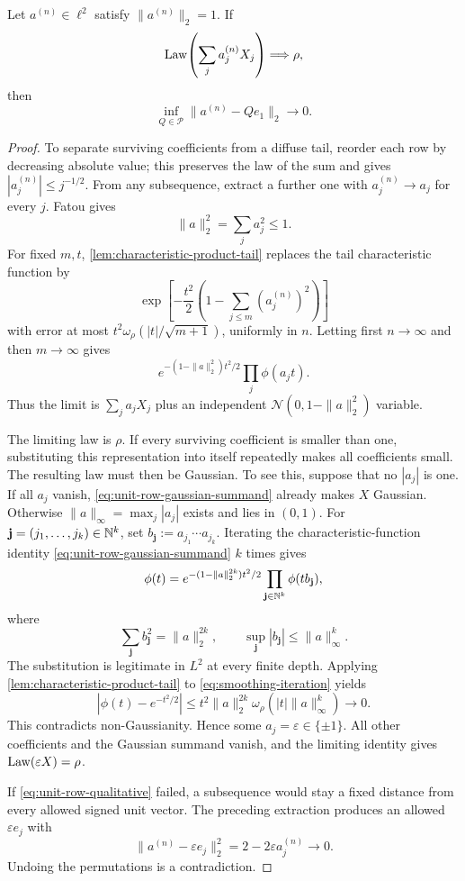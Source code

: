 \begin{lemma}
\label{lem:unit-row-rigidity}
Let $a^{(n)}\in\ell^2$ satisfy $\|a^{(n)}\|_2=1$.  If
\[
 \operatorname{Law}\!\left(\sum_j a_j^{(n)}X_j\right)
       \Longrightarrow\rho,
\]
then
\begin{equation}
 \inf_{Q\in\mathcal P}\|a^{(n)}-Qe_1\|_2\longrightarrow0.
 \label{eq:unit-row-qualitative}
\end{equation}
\end{lemma}
\begin{proof}
To separate surviving coefficients from a diffuse tail, reorder each row
by decreasing absolute value; this preserves the law of the
sum and gives $|a_j^{(n)}|\le j^{-1/2}$.  From any subsequence, extract a
further one with $a_j^{(n)}\to a_j$ for every $j$.  Fatou gives
\[
 \|a\|_2^2=\sum_j a_j^2\leq1.
\]
For fixed $m,t$, \cref{lem:characteristic-product-tail} replaces the tail
characteristic function by
\[
 \exp\!\left[-\frac{t^2}{2}
        \left(1-\sum_{j\leq m}(a_j^{(n)})^2\right)\right]
\]
with error at most $t^2\omega_\rho(|t|/\sqrt{m+1})$, uniformly in $n$.
Letting first $n\to\infty$ and then $m\to\infty$ gives
\begin{equation}
 e^{-(1-\|a\|_2^2)t^2/2}\prod_j\phi(a_jt).
 \label{eq:unit-row-gaussian-summand}
\end{equation}
Thus the limit is $\sum_j a_jX_j$ plus an independent
$\mathcal N(0,1-\|a\|_2^2)$ variable.

The limiting law is \(\rho\). If every surviving coefficient is smaller
than one, substituting this representation into itself repeatedly makes
all coefficients small. The resulting law must then be Gaussian.
To see this, suppose that no $|a_j|$ is one. If all $a_j$ vanish,
\eqref{eq:unit-row-gaussian-summand} already makes $X$ Gaussian.
Otherwise $\|a\|_\infty=\max_j|a_j|$ exists and lies in $(0,1)$.  For
$\mathbf j=(j_1,\ldots,j_k)\in\mathbb N^k$, set
$b_{\mathbf j}:=a_{j_1}\cdots a_{j_k}$.
Iterating the characteristic-function identity
\eqref{eq:unit-row-gaussian-summand} $k$ times gives
\begin{equation}
 \phi(t)=e^{-(1-\|a\|_2^{2k})t^2/2}
       \prod_{\mathbf j\in\mathbb N^k}\phi(tb_{\mathbf j}),
 \label{eq:smoothing-iteration}
\end{equation}
where
\[
 \sum_{\mathbf j} b_{\mathbf j}^2=\|a\|_2^{2k},
 \qquad \sup_{\mathbf j}|b_{\mathbf j}|\leq \|a\|_\infty^k.
\]
The substitution is legitimate in $L^2$ at every finite depth.  Applying
\cref{lem:characteristic-product-tail} to
\eqref{eq:smoothing-iteration} yields
\[
 |\phi(t)-e^{-t^2/2}|
 \leq t^2\|a\|_2^{2k}\omega_\rho(|t|\|a\|_\infty^k)\longrightarrow0.
\]
This contradicts non-Gaussianity.  Hence some
$a_j=\varepsilon\in\{\pm1\}$.  All other coefficients and the Gaussian
summand vanish, and the limiting identity gives $\operatorname{Law}(\varepsilon X)=\rho$.

If \eqref{eq:unit-row-qualitative} failed, a subsequence would stay a fixed
distance from every allowed signed unit vector.  The preceding extraction
produces an allowed $\varepsilon e_j$ with
\[
 \|a^{(n)}-\varepsilon e_j\|_2^2
       =2-2\varepsilon a_j^{(n)}\longrightarrow0.
\]
Undoing the permutations is a contradiction.
\end{proof}

